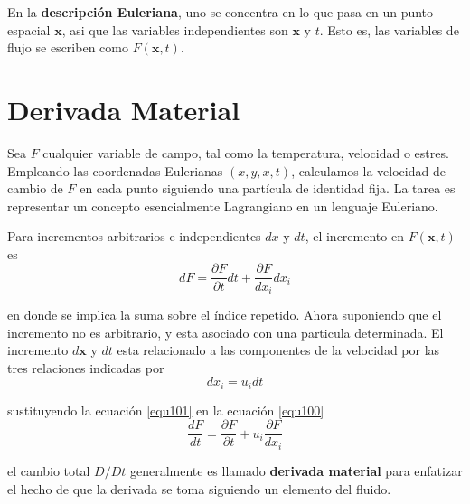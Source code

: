 \documentclass[12pt]{book}
\theoremstyle{definition}
\theoremstyle{remark}
\theoremstyle{plain}
\begin{document}
En la \textbf{descripción Euleriana}, uno se concentra en lo que pasa en un punto espacial $\mathbf{x}$, asi que las variables independientes son $\mathbf{x}$ y $t$. Esto es, las variables de flujo se escriben como $F(\mathbf{x},t)$.

\section{Derivada Material}
Sea $F$ cualquier variable de campo, tal como la temperatura, velocidad o estres. Empleando las coordenadas Eulerianas $(x,y,x,t)$, calculamos la velocidad de cambio de $F$ en cada punto siguiendo una partícula de identidad fija. La tarea es representar un concepto esencialmente Lagrangiano en un lenguaje Euleriano.

Para incrementos arbitrarios e independientes $dx$ y $dt$, el incremento en $F(\mathbf{x}, t)$ es
\begin{equation}
\label{equ100}
d F = \frac{\partial F}{\partial t} d t + \frac{\partial F}{d x_i} d x_i
\end{equation}

en donde se implica la suma sobre el índice repetido. Ahora suponiendo que el incremento no es arbitrario, y esta asociado con una particula determinada. El incremento $d\mathbf{x}$ y $d t$ esta relacionado a las componentes de la velocidad por las tres relaciones indicadas por
\begin{equation}
\label{equ101}
d x_i = u_i dt
\end{equation}

sustituyendo la ecuación \ref{equ101} en la ecuación \ref{equ100} 
\begin{equation}
\label{equ102}
\frac{d F}{dt} = \frac{\partial F}{\partial t}  + u_i \frac{\partial F}{d x_i} 
\end{equation}

el cambio total $D/Dt$ generalmente es llamado \textbf{derivada material} para enfatizar el hecho de que la derivada se toma siguiendo un elemento del fluido.

\backmatter
\end{document}
